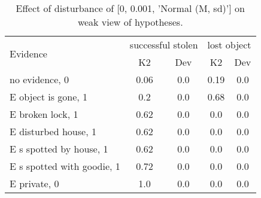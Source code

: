 \begin{table}\begin{tabular}{l|cc|cc}\toprule\multirow{2}{*}{Evidence} & \multicolumn{2}{c}{successful stolen}& \multicolumn{2}{c}{lost object}\\& {K2} & {Dev}& {K2} & {Dev}\\\midrule
no evidence, 0 & \cellcolor{Bittersweet}0.06&\cellcolor{Bittersweet}0.0&\cellcolor{Bittersweet}0.19&\cellcolor{Bittersweet}0.0\\E object is gone, 1 & \cellcolor{Bittersweet}0.2&\cellcolor{Bittersweet}0.0&\cellcolor{Bittersweet}0.68&\cellcolor{Bittersweet}0.0\\E broken lock, 1 & \cellcolor{Bittersweet}0.62&\cellcolor{Bittersweet}0.0&\cellcolor{Bittersweet}0.0&\cellcolor{Bittersweet}0.0\\E disturbed house, 1 & \cellcolor{Bittersweet}0.62&\cellcolor{Bittersweet}0.0&\cellcolor{Bittersweet}0.0&\cellcolor{Bittersweet}0.0\\E s spotted by house, 1 & \cellcolor{Bittersweet}0.62&\cellcolor{Bittersweet}0.0&\cellcolor{Bittersweet}0.0&\cellcolor{Bittersweet}0.0\\E s spotted with goodie, 1 & \cellcolor{Bittersweet}0.72&\cellcolor{Bittersweet}0.0&\cellcolor{Bittersweet}0.0&\cellcolor{Bittersweet}0.0\\E private, 0 & \cellcolor{Bittersweet}1.0&\cellcolor{Bittersweet}0.0&\cellcolor{Bittersweet}0.0&\cellcolor{Bittersweet}0.0\\\bottomrule\end{tabular}\caption{Effect of disturbance of [0, 0.001, 'Normal (M, sd)'] on weak view of hypotheses.}\end{table}